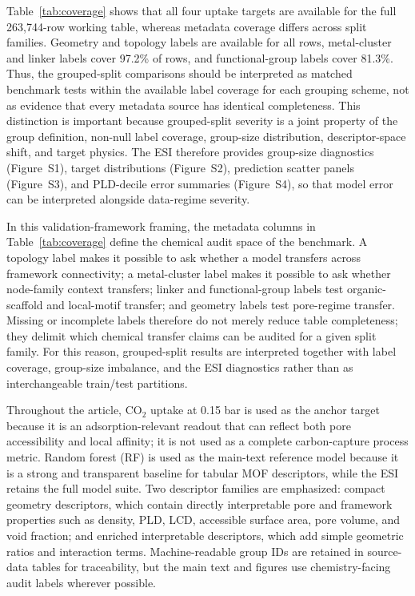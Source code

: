 \documentclass[11pt,a4paper]{article}
\begin{document}
Table~\ref{tab:coverage} shows that all four uptake targets are available for the full 263,744-row working table, whereas metadata coverage differs across split families. Geometry and topology labels are available for all rows, metal-cluster and linker labels cover 97.2\% of rows, and functional-group labels cover 81.3\%. Thus, the grouped-split comparisons should be interpreted as matched benchmark tests within the available label coverage for each grouping scheme, not as evidence that every metadata source has identical completeness. This distinction is important because grouped-split severity is a joint property of the group definition, non-null label coverage, group-size distribution, descriptor-space shift, and target physics. The ESI therefore provides group-size diagnostics (Figure~S1), target distributions (Figure~S2), prediction scatter panels (Figure~S3), and PLD-decile error summaries (Figure~S4), so that model error can be interpreted alongside data-regime severity.


In this validation-framework framing, the metadata columns in Table~\ref{tab:coverage} define the chemical audit space of the benchmark. A topology label makes it possible to ask whether a model transfers across framework connectivity; a metal-cluster label makes it possible to ask whether node-family context transfers; linker and functional-group labels test organic-scaffold and local-motif transfer; and geometry labels test pore-regime transfer. Missing or incomplete labels therefore do not merely reduce table completeness; they delimit which chemical transfer claims can be audited for a given split family. For this reason, grouped-split results are interpreted together with label coverage, group-size imbalance, and the ESI diagnostics rather than as interchangeable train/test partitions.


Throughout the article, CO$_2$ uptake at 0.15 bar is used as the anchor target because it is an adsorption-relevant readout that can reflect both pore accessibility and local affinity; it is not used as a complete carbon-capture process metric. Random forest (RF) is used as the main-text reference model because it is a strong and transparent baseline for tabular MOF descriptors, while the ESI retains the full model suite. Two descriptor families are emphasized: compact geometry descriptors, which contain directly interpretable pore and framework properties such as density, PLD, LCD, accessible surface area, pore volume, and void fraction; and enriched interpretable descriptors, which add simple geometric ratios and interaction terms. Machine-readable group IDs are retained in source-data tables for traceability, but the main text and figures use chemistry-facing audit labels wherever possible.
\end{document}
